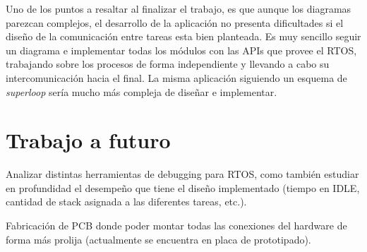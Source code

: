 \documentclass{IEEEtran}
\begin{document}
Uno de los puntos a resaltar al finalizar el trabajo, es que aunque los diagramas parezcan complejos, el desarrollo de la aplicación no presenta dificultades si el diseño de la comunicación entre tareas esta bien planteada. Es muy sencillo seguir un diagrama e implementar todas los módulos con las APIs que provee el RTOS, trabajando sobre los procesos de forma independiente y llevando a cabo su intercomunicación hacia el final. La misma aplicación siguiendo un esquema de \textit{superloop} sería mucho más compleja de diseñar e implementar.

\section{Trabajo a futuro}
Analizar distintas herramientas de debugging para RTOS, como también estudiar en profundidad el desempeño que tiene el diseño implementado (tiempo en IDLE, cantidad de stack asignada a las diferentes tareas, etc.).

Fabricación de PCB donde poder montar todas las conexiones del hardware de forma más prolija (actualmente se encuentra en placa de prototipado).

\printbibliography
\end{document}
